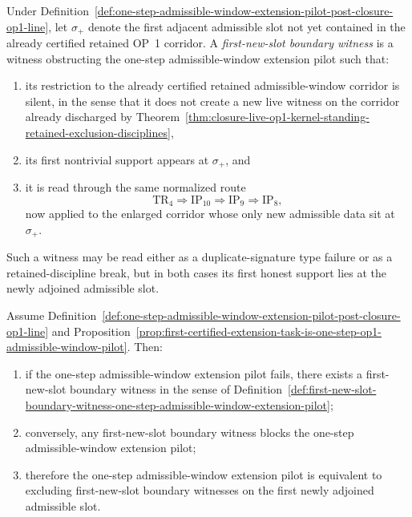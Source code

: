 \begin{definition}
\label{def:first-new-slot-boundary-witness-one-step-admissible-window-extension-pilot}
Under Definition~\ref{def:one-step-admissible-window-extension-pilot-post-closure-op1-line}, let $\sigma_{+}$ denote the first adjacent admissible slot not yet contained in the already certified retained OP~1 corridor. A \emph{first-new-slot boundary witness} is a witness obstructing the one-step admissible-window extension pilot such that:
\begin{enumerate}[leftmargin=2em,label=(\roman*)]
  \item its restriction to the already certified retained admissible-window corridor is silent, in the sense that it does not create a new live witness on the corridor already discharged by Theorem~\ref{thm:closure-live-op1-kernel-standing-retained-exclusion-disciplines},
  \item its first nontrivial support appears at $\sigma_{+}$, and
  \item it is read through the same normalized route
  \[
  \mathrm{TR}_4 \Longrightarrow \mathrm{IP}_{10} \Longrightarrow \mathrm{IP}_9 \Longrightarrow \mathrm{IP}_8,
  \]
  now applied to the enlarged corridor whose only new admissible data sit at $\sigma_{+}$.
\end{enumerate}
Such a witness may be read either as a duplicate-signature type failure or as a retained-discipline break, but in both cases its first honest support lies at the newly adjoined admissible slot.
\end{definition}

\begin{proposition}
\label{prop:boundary-witnesses-one-step-admissible-window-pilot-localize-first-new-slot}
Assume Definition~\ref{def:one-step-admissible-window-extension-pilot-post-closure-op1-line} and Proposition~\ref{prop:first-certified-extension-task-is-one-step-op1-admissible-window-pilot}. Then:
\begin{enumerate}[leftmargin=2em,label=(\roman*)]
  \item if the one-step admissible-window extension pilot fails, there exists a first-new-slot boundary witness in the sense of Definition~\ref{def:first-new-slot-boundary-witness-one-step-admissible-window-extension-pilot};
  \item conversely, any first-new-slot boundary witness blocks the one-step admissible-window extension pilot;
  \item therefore the one-step admissible-window extension pilot is equivalent to excluding first-new-slot boundary witnesses on the first newly adjoined admissible slot.
\end{enumerate}
\end{proposition}

